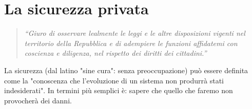 \chapter{La sicurezza privata}
\label{capitolo2}
\thispagestyle{empty}

\begin{quotation}
	\noindent\footnotesize\emph{\textquotedblleft Giuro di osservare lealmente le leggi e le altre disposizioni vigenti nel territorio della Repubblica e di adempiere le funzioni affidatemi con coscienza e diligenza, nel rispetto dei diritti dei cittadini.\textquotedblright}
\end{quotation}
La sicurezza (dal latino "sine cura": senza preoccupazione) può essere definita come la "conoscenza che l'evoluzione di un sistema non produrrà stati indesiderati". In termini più semplici è: sapere che quello che faremo non provocherà dei danni.\cite{wiki:sicurezza}

